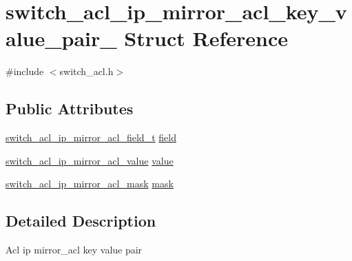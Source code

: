 \hypertarget{structswitch__acl__ip__mirror__acl__key__value__pair__}{\section{switch\+\_\+acl\+\_\+ip\+\_\+mirror\+\_\+acl\+\_\+key\+\_\+value\+\_\+pair\+\_\+ Struct Reference}
\label{structswitch__acl__ip__mirror__acl__key__value__pair__}
}


{\ttfamily \#include $<$switch\+\_\+acl.\+h$>$}

\subsection*{Public Attributes}
\begin{DoxyCompactItemize}
\item 
\hyperlink{group__ACL_ga6b1c3fc9bbdc06497cada468a2dfa1f0}{switch\+\_\+acl\+\_\+ip\+\_\+mirror\+\_\+acl\+\_\+field\+\_\+t} \hyperlink{structswitch__acl__ip__mirror__acl__key__value__pair___a58b2aea4bac0ee482f8e10d3db2c3076}{field}
\item 
\hyperlink{group__ACL_gaab3f7b11b6bb86c122f1c7dfa48d8753}{switch\+\_\+acl\+\_\+ip\+\_\+mirror\+\_\+acl\+\_\+value} \hyperlink{structswitch__acl__ip__mirror__acl__key__value__pair___a16e350a986e8419d206bee11e34e8726}{value}
\item 
\hyperlink{group__ACL_ga846b6479df0e1a11dcc41e565b44abfb}{switch\+\_\+acl\+\_\+ip\+\_\+mirror\+\_\+acl\+\_\+mask} \hyperlink{structswitch__acl__ip__mirror__acl__key__value__pair___a6c192f608bb8140f71580178ab7fb192}{mask}
\end{DoxyCompactItemize}


\subsection{Detailed Description}
Acl ip mirror\+\_\+acl key value pair 

